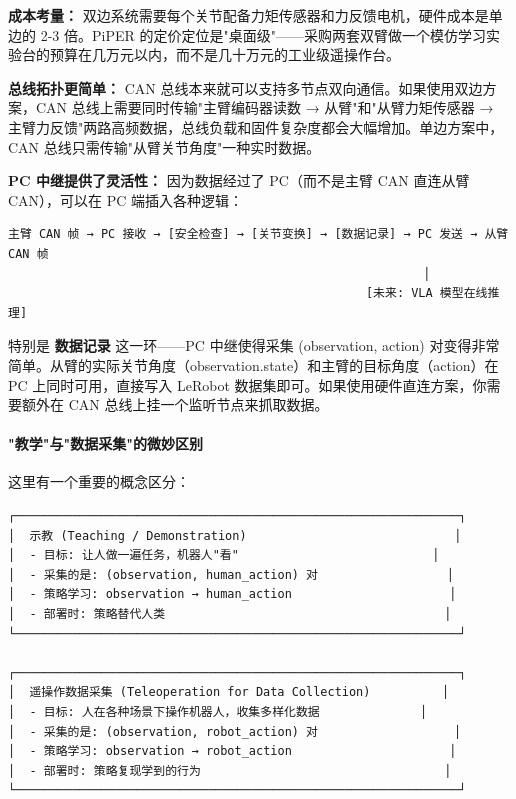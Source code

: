 \documentclass[UTF8,a4paper,11pt]{ctexart}
\begin{document}
\textbf{成本考量：} 双边系统需要每个关节配备力矩传感器和力反馈电机，硬件成本是单边的 2-3 倍。PiPER 的定价定位是"桌面级"——采购两套双臂做一个模仿学习实验台的预算在几万元以内，而不是几十万元的工业级遥操作台。

\textbf{总线拓扑更简单：} CAN 总线本来就可以支持多节点双向通信。如果使用双边方案，CAN 总线上需要同时传输"主臂编码器读数 → 从臂"和"从臂力矩传感器 → 主臂力反馈"两路高频数据，总线负载和固件复杂度都会大幅增加。单边方案中，CAN 总线只需传输"从臂关节角度"一种实时数据。

\textbf{PC 中继提供了灵活性：} 因为数据经过了 PC（而不是主臂 CAN 直连从臂 CAN），可以在 PC 端插入各种逻辑：

\begin{lstlisting}[language=text]
主臂 CAN 帧 → PC 接收 → [安全检查] → [关节变换] → [数据记录] → PC 发送 → 从臂 CAN 帧
                                                          │
                                                  [未来: VLA 模型在线推理]
\end{lstlisting}

特别是 \textbf{数据记录} 这一环——PC 中继使得采集 (observation, action) 对变得非常简单。从臂的实际关节角度（observation.state）和主臂的目标角度（action）在 PC 上同时可用，直接写入 LeRobot 数据集即可。如果使用硬件直连方案，你需要额外在 CAN 总线上挂一个监听节点来抓取数据。

\paragraph{"教学"与"数据采集"的微妙区别}


这里有一个重要的概念区分：

\begin{lstlisting}[language=text]
┌──────────────────────────────────────────────────────────────┐
│  示教 (Teaching / Demonstration)                             │
│  - 目标: 让人做一遍任务，机器人"看"                           │
│  - 采集的是: (observation, human_action) 对                  │
│  - 策略学习: observation → human_action                      │
│  - 部署时: 策略替代人类                                       │
└──────────────────────────────────────────────────────────────┘

┌──────────────────────────────────────────────────────────────┐
│  遥操作数据采集 (Teleoperation for Data Collection)          │
│  - 目标: 人在各种场景下操作机器人，收集多样化数据              │
│  - 采集的是: (observation, robot_action) 对                   │
│  - 策略学习: observation → robot_action                      │
│  - 部署时: 策略复现学到的行为                                  │
└──────────────────────────────────────────────────────────────┘
\end{lstlisting}
\end{document}
